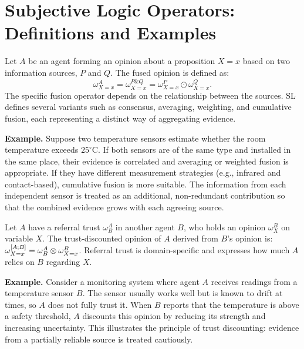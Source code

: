 \clearpage
\appendices
\onecolumn

\section{Subjective Logic Operators: Definitions and Examples}
\label{app:operators}
\begin{definition}
\label{def:fusion-app}
Let \(A\) be an agent forming an opinion about a proposition \(X=x\) based on two information sources, \(P\) and \(Q\). The fused opinion is defined as:
\begin{equation}
    \omega^A_{X=x} = \omega^{P \& Q}_{X=x} = \omega^P_{X=x} \odot \omega^Q_{X=x}.
\end{equation}
The specific fusion operator depends on the relationship between the sources. SL defines several variants such as consensus, averaging, weighting, and cumulative fusion, each representing a distinct way of aggregating evidence. 

\textbf{Example.} Suppose two temperature sensors estimate whether the room temperature exceeds \(25^\circ\)C. If both sensors are of the same type and installed in the same place, their evidence is correlated and averaging or weighted fusion is appropriate. If they have different measurement strategies (e.g., infrared and contact-based), cumulative fusion is more suitable. The information from each independent sensor is treated as an additional, non-redundant contribution so that the combined evidence grows with each agreeing source.
\end{definition}

\begin{definition}
\label{def:discount}
Let \(A\) have a referral trust \(\omega^A_B\) in another agent \(B\), who holds an opinion \(\omega^B_X\) on variable \(X\). The trust-discounted opinion of \(A\) derived from \(B\)'s opinion is:
\(
    \omega^{[A;B]}_{X=x} = \omega^A_B \otimes \omega^B_{X=x} \notag
\). Referral trust is domain-specific and expresses how much \(A\) relies on \(B\) regarding \(X\).

\textbf{Example.} Consider a monitoring system where agent $A$ receives readings from a temperature sensor $B$. 
The sensor usually works well but is known to drift at times, so $A$ does not fully trust it. 
When $B$ reports that the temperature is above a safety threshold, $A$ discounts this opinion by reducing its strength and increasing uncertainty. 
This illustrates the principle of trust discounting: evidence from a partially reliable source is treated cautiously.
\end{definition}


